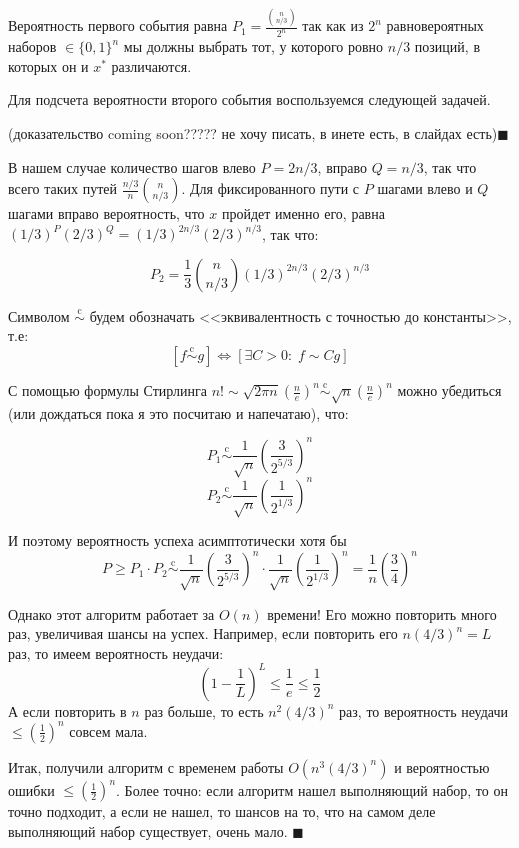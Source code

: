Вероятность первого события равна $P_1 = \frac{{n\choose{n/3}}}{2^n}$ так как из $2^n$ равновероятных наборов $\in \{0, 1\}^n$ мы должны выбрать тот, у которого ровно $n/3$ позиций, в которых он и $x^*$ различаются. 

Для подсчета вероятности второго события воспользуемся следующей задачей.


(доказательство coming soon????? не хочу писать, в инете есть, в слайдах есть)$\blacksquare$
\needpicture

В нашем случае количество шагов влево $P = 2n/3$, вправо $Q=n/3$, так что всего таких путей $\frac{n/3}{n}{n\choose n/3}$. Для фиксированного пути с $P$ шагами влево и $Q$ шагами вправо вероятность, что $x$ пройдет именно его, равна $(1/3)^P (2/3)^Q = (1/3)^{2n/3} (2/3)^{n/3}$, так что:

$$P_2 = \frac{1}{3} {n\choose n/3} (1/3)^{2n/3} (2/3)^{n/3}$$

\newcommand{\scm}{\overset{\text{c}}{\sim}}
Символом $\scm$ будем обозначать <<эквивалентность с точностью до константы>>, т.е: $$[f \scm g] \iff [\exists C > 0: \; f \sim Cg]$$

С помощью формулы Стирлинга $n! \sim \sqrt{2\pi n}(\frac{n}{e})^n \scm \sqrt{n}(\frac{n}{e})^n$ можно убедиться (или дождаться пока я это посчитаю и напечатаю), что:

$$ P_1 \scm \frac{1}{\sqrt n}(\frac{3}{2^{5/3}})^n$$
$$ P_2 \scm \frac{1}{\sqrt n}(\frac{1}{2^{1/3}})^n$$

И поэтому вероятность успеха асимптотически хотя бы 
$$P \geq P_1 \cdot P_2 \scm \frac{1}{\sqrt n}(\frac{3}{2^{5/3}})^n \cdot \frac{1}{\sqrt n}(\frac{1}{2^{1/3}})^n = \frac{1}{n}(\frac{3}{4})^n$$

Однако этот алгоритм работает за $O(n)$ времени! Его можно повторить много раз, увеличивая шансы на успех. Например, если повторить его $n(4/3)^n = L$ раз, то имеем вероятность неудачи:
$$(1-\frac{1}{L})^L \leq \frac{1}{e} \leq \frac{1}{2}$$
А если повторить в $n$ раз больше, то есть $n^2(4/3)^n$ раз, то вероятность неудачи $\leq (\frac{1}{2})^n$ совсем мала.

Итак, получили алгоритм с временем работы $O(n^3(4/3)^n)$ и вероятностью ошибки $\leq (\frac{1}{2})^n$. Более точно: если алгоритм нашел выполняющий набор, то он точно подходит, а если не нашел, то шансов на то, что на самом деле выполняющий набор существует, очень мало. $\blacksquare$











